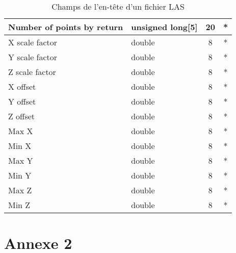 \begin{table}[htpb!]
\begin{tabular}{|l|l|c|c|}
Number of points by return           & unsigned long{[}5{]}     & 20    & * \\ \hline
X scale factor                       & double                   & 8     & * \\ \hline
Y scale factor                       & double                   & 8     & * \\ \hline
Z scale factor                       & double                   & 8     & * \\ \hline
X offset                             & double                   & 8     & * \\ \hline
Y offset                             & double                   & 8     & * \\ \hline
Z offset                             & double                   & 8     & * \\ \hline
Max X                                & double                   & 8     & * \\ \hline
Min X                                & double                   & 8     & * \\ \hline
Max Y                                & double                   & 8     & * \\ \hline
Min Y                                & double                   & 8     & * \\ \hline
Max Z                                & double                   & 8     & * \\ \hline
Min Z                                & double                   & 8     & * \\ \hline
\end{tabular}
\caption[Champs de l'en-tête d'un fichier LAS]{Champs de l'en-tête d'un fichier LAS}
\label{tab:las_header}
\end{table}

\chapter*{Annexe 2}

